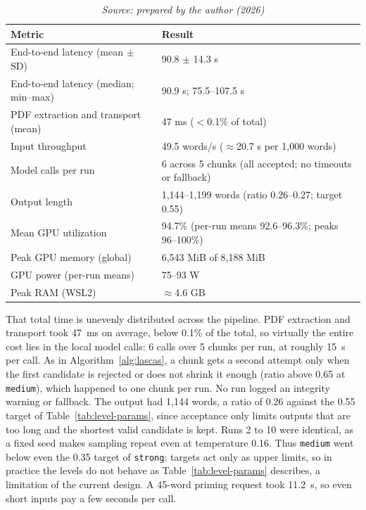 \documentclass[english]{UNISINOSartigo} %
\newcommand{\floatsource}[1]{\caption*{\footnotesize\textit{Source: #1}}}
\newcommand{\tablesource}[1]{\floatsource{#1}}
\begin{document}
\begin{table}[H]\centering
\caption{Backend performance at the \texttt{medium} level (10 warm runs, 4,392-word petition).}
\label{tab:bench-results}
\footnotesize
\setlength{\tabcolsep}{4pt}
\renewcommand{\arraystretch}{1.0}
\begin{tabular}{@{}ll@{}}
\toprule
\textbf{Metric} & \textbf{Result} \\
\midrule
End-to-end latency (mean $\pm$ SD) & 90.8 $\pm$ 14.3 s \\
End-to-end latency (median; min--max) & 90.9 s; 75.5--107.5 s \\
PDF extraction and transport (mean) & 47 ms ($<$0.1\% of total) \\
Input throughput & 49.5 words/s ($\approx$20.7 s per 1,000 words) \\
Model calls per run & 6 across 5 chunks (all accepted; no timeouts or fallback) \\
Output length & 1,144--1,199 words (ratio 0.26--0.27; target 0.55) \\
Mean GPU utilization & 94.7\% (per-run means 92.6--96.3\%; peaks 96--100\%) \\
Peak GPU memory (global) & 6,543 MiB of 8,188 MiB \\
GPU power (per-run means) & 75--93 W \\
Peak RAM (WSL2) & $\approx$4.6 GB \\
\bottomrule
\end{tabular}
\tablesource{prepared by the author (2026)}
\end{table}

That total time is unevenly distributed across the pipeline. PDF extraction and transport took 47~ms on average, below 0.1\% of the total, so virtually the entire cost lies in the local model calls: 6 calls over 5 chunks per run, at roughly 15~s per call. As in Algorithm~\ref{alg:lascas}, a chunk gets a second attempt only when the first candidate is rejected or does not shrink it enough (ratio above 0.65 at \texttt{medium}), which happened to one chunk per run. No run logged an integrity warning or fallback. The output had 1,144 words, a ratio of 0.26 against the 0.55 target of Table~\ref{tab:level-params}, since acceptance only limits outputs that are too long and the shortest valid candidate is kept. Runs 2 to 10 were identical, as a fixed seed makes sampling repeat even at temperature 0.16. Thus \texttt{medium} went below even the 0.35 target of \texttt{strong}: targets act only as upper limits, so in practice the levels do not behave as Table~\ref{tab:level-params} describes, a limitation of the current design. A 45-word priming request took 11.2~s, so even short inputs pay a few seconds per call.
\end{document}
